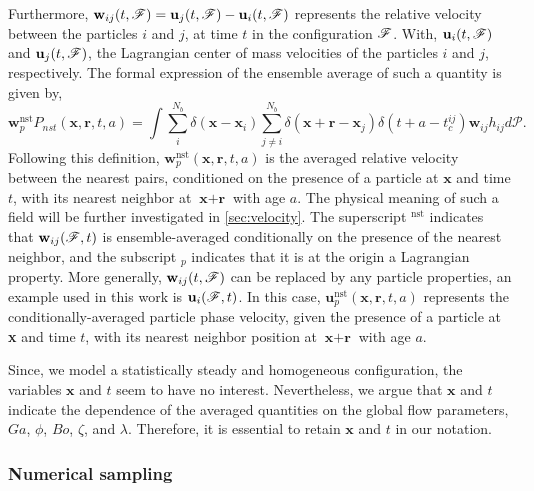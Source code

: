 Furthermore, $\textbf{w}_{ij}(t,\mathscr{F}) = \textbf{u}_j(t,\mathscr{F}) - \textbf{u}_i(t,\mathscr{F})$ represents the relative velocity between the particles $i$ and $j$, at time $t$ in the configuration $\mathscr{F}$. 
With, $\textbf{u}_i(t,\mathscr{F})$ and $\textbf{u}_j(t,\mathscr{F})$, the Lagrangian center of mass velocities of the particles $i$ and $j$, respectively. 
The formal expression of the ensemble average of such a quantity is given by,
\begin{equation*}
    \textbf{w}^\text{nst}_p P_{nst}(\textbf{x},\textbf{r},t,a)
    = 
    \int \sum_{i}^{N_b}\delta(\textbf{x}-\textbf{x}_i)
    \sum_{j\neq i}^{N_b}\delta(\textbf{x}+\textbf{r}-\textbf{x}_j) 
    \delta(t+a-t_c^{ij}) 
    \textbf{w}_{ij}
    h_{ij} 
    d\mathscr{P}.
    \label{eq:q_nstij}
\end{equation*}
Following this definition, $\textbf{w}^\text{nst}_p(\textbf{x},\textbf{r},t,a)$ is the averaged relative velocity between the nearest pairs, conditioned on the presence of a particle at $\textbf{x}$ and time $t$, with its nearest neighbor at $\textbf{x}+\textbf{r}$ with age $a$. 
The physical meaning of such a field will be further investigated in \ref{sec:velocity}. 
The superscript $^\text{nst}$ indicates that $\textbf{w}_{ij}(\mathscr{F},t)$ is ensemble-averaged conditionally on the presence of the nearest neighbor, and the subscript $_p$ indicates that it is at the origin a Lagrangian property. 
More generally, $\textbf{w}_{ij}(t,\mathscr{F})$ can be replaced by any particle properties, an example used in this work is $\textbf{u}_i(\mathscr{F},t)$.
In this case, $\textbf{u}^\text{nst}_p(\textbf{x},\textbf{r},t,a)$ represents the conditionally-averaged particle phase velocity, given the presence of a particle at \textbf{x} and time $t$, with its nearest neighbor position at $\textbf{x}+\textbf{r}$ with age $a$. 

Since, we model a statistically steady and homogeneous configuration, the variables $\mathbf{x}$ and $t$ seem to have no interest. 
Nevertheless, we argue that $\mathbf{x}$ and $t$ indicate the dependence of the averaged quantities on the global flow parameters, $Ga$, $\phi$, $Bo$, $\zeta$, and $\lambda$.
Therefore, it is essential to retain $\mathbf{x}$ and $t$ in our notation. 



\subsubsection*{Numerical sampling}


